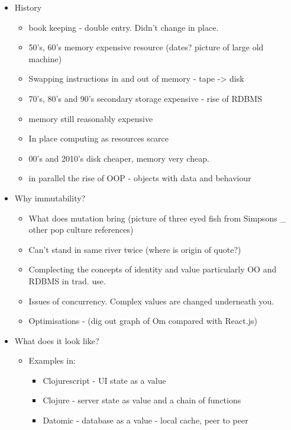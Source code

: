 \documentclass[11pt]{article}
\begin{document}
\begin{NOTES}
\begin{itemize}
\item History
\begin{itemize}
\item book keeping - double entry. Didn't change in place.
\item 50's, 60's memory expensive resource (dates? picture of large old machine)
\item Swapping instructions in and out of memory - tape -> disk
\item 70's, 80's and 90's secondary storage expensive - rise of RDBMS
\item memory still reasonably expensive
\item In place computing as resources scarce
\item 00's and 2010's disk cheaper, memory very cheap.
\item in parallel the rise of OOP - objects with data and behaviour
\end{itemize}
\item Why immutability?
\begin{itemize}
\item What does mutation bring (picture of three eyed fish from Simpsons \_ other pop culture references)
\item Can't stand in same river twice (where is origin of quote?)
\item Complecting the concepts of identity and value particularly OO and RDBMS in trad. use.
\item Issues of concurrency. Complex values are changed underneath you.
\item Optimisations - (dig out graph of Om compared with React.js)
\end{itemize}
\item What does it look like?
\begin{itemize}
\item Examples in:
\begin{itemize}
\item Clojurescript - UI state as a value
\item Clojure - server state as value and a chain of functions
\item Datomic - database as a value - local cache, peer to peer
\end{itemize}
\end{itemize}
\end{itemize}
\end{NOTES}
\end{document}
